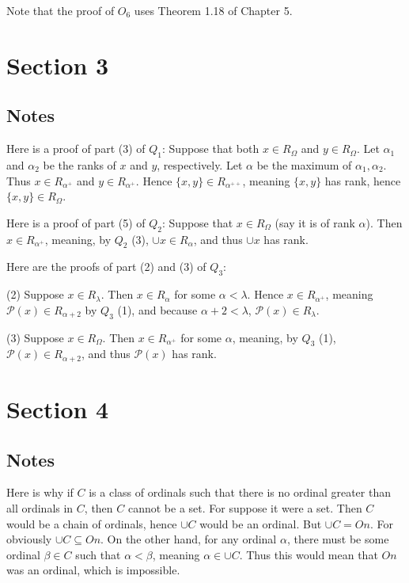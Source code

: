 \documentclass{article}
\theoremstyle{definition}
\begin{document}
Note that the proof of $O_6$ uses Theorem 1.18 of Chapter 5.

\section*{Section 3}

\subsection*{Notes}
Here is a proof of part (3) of $Q_1$: Suppose that both $x\in R_\Omega$ and $y\in R_\Omega$. Let $\alpha_1$ and $\alpha_2$ be the ranks of 
$x$ and $y$, respectively. Let $\alpha$ be the maximum of $\alpha_1,\alpha_2$. Thus $x\in R_{\alpha^+}$ and $y\in R_{\alpha^+}$. Hence 
$\{x,y\}\in R_{\alpha^{++}}$, meaning $\{x,y\}$ has rank, hence $\{x,y\}\in R_\Omega$.

Here is a proof of part (5) of $Q_2$: Suppose that $x\in R_\Omega$ (say it is of rank $\alpha$). Then $x\in R_{\alpha^+}$, meaning, by $Q_2$ (3), 
$\cup x\in R_\alpha$, and thus $\cup x$ has rank.

Here are the proofs of part (2) and (3) of $Q_3$:

(2) Suppose $x\in R_\lambda$. Then $x\in R_\alpha$ for some $\alpha<\lambda$. Hence $x\in R_{\alpha^+}$, meaning 
$\mathcal{P}(x)\in R_{\alpha+2}$ by $Q_3$ (1), and because $\alpha+2<\lambda$, $\mathcal{P}(x)\in R_\lambda$.

(3) Suppose $x\in R_\Omega$. Then $x\in R_{\alpha^+}$ for some $\alpha$, meaning, by $Q_3$ (1), 
$\mathcal{P}(x)\in R_{\alpha+2}$, and thus $\mathcal{P}(x)$ has rank.

\section*{Section 4}

\subsection*{Notes}
Here is why if $C$ is a class of ordinals such that there is no ordinal greater than all ordinals in $C$, then $C$ cannot be a set. For suppose it were a 
set. Then $C$ would be a chain of ordinals, hence $\cup C$ would be an ordinal. But $\cup C=On$. For obviously $\cup C\subseteq On$. On the other hand, for any 
ordinal $\alpha$, there must be some ordinal $\beta\in C$ such that $\alpha<\beta$, meaning $\alpha\in\cup C$. Thus this would mean that $On$ was an ordinal, which 
is impossible. 
\end{document}
